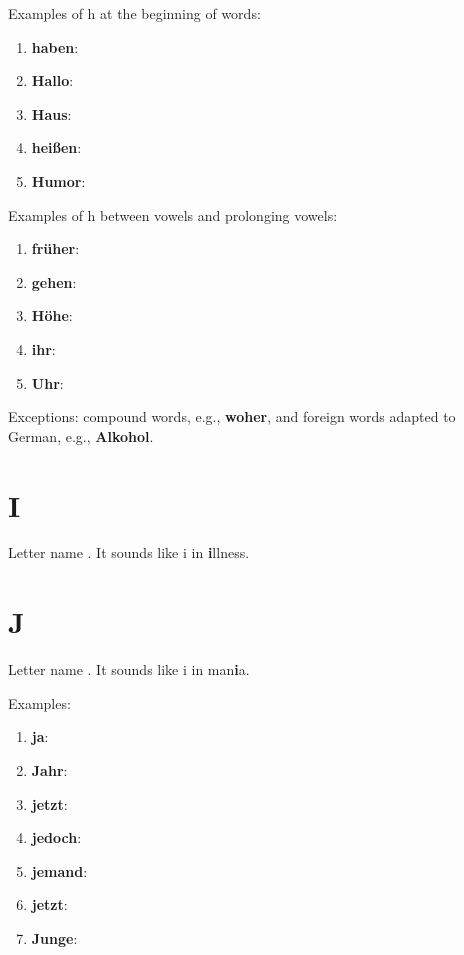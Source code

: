 Examples of h at the beginning of words:
\begin{enumerate}
    \item \textbf{haben}: \textipa{["ha:b@n]}
    \item \textbf{Hallo}: \textipa{[ha"lo:]}
    \item \textbf{Haus}: \textipa{[haUs]}
    \item \textbf{heißen}: \textipa{["haIs@n]}
    \item \textbf{Humor}: \textipa{[hu"mo:r]}
\end{enumerate}

Examples of h between vowels and prolonging vowels:
\begin{enumerate}
    \item \textbf{früher}: \textipa{["fry:@r]}
    \item \textbf{gehen}: \textipa{["ge:@n]}
    \item \textbf{Höhe}: \textipa{["h{\o}:@]}
    \item \textbf{ihr}: \textipa{[i:r]}
    \item \textbf{Uhr}: \textipa{[u:r]}
\end{enumerate}

Exceptions: compound words, e.g., \textbf{woher}, and foreign words adapted to German, e.g., \textbf{Alkohol}.

\section*{I}

Letter name \textipa{[i:]}. It sounds like i in \textbf{i}llness.

\section*{J}

Letter name \textipa{[jOt]}. It sounds like i in man\textbf{i}a.

Examples:
\begin{enumerate}
    \item \textbf{ja}: \textipa{[ja:]}
    \item \textbf{Jahr}: \textipa{[ja:r]}
    \item \textbf{jetzt}: \textipa{[jEtst]}
    \item \textbf{jedoch}: \textipa{[je:"dOx]}
    \item \textbf{jemand}: \textipa{["je:mant]}
    \item \textbf{jetzt}: \textipa{[jEtst]}
    \item \textbf{Junge}: \textipa{["juN@]}
\end{enumerate}

